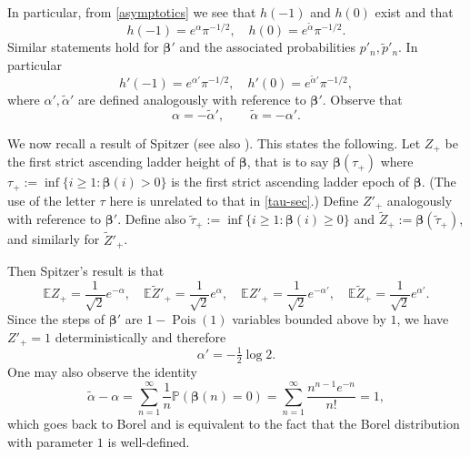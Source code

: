 \documentclass[11pt,reqno]{amsart}
\numberwithin{equation}{section}
\theoremstyle{definition}
\theoremstyle{remark}
\newcommand{\mb}{\mathbb}
\newcommand\Pois{\operatorname{Pois}}
\def\boldbeta{\boldsymbol\beta}
\renewcommand{\ge}{\geqslant}
\begin{document}
In particular, from \cref{asymptotics} we see that $h(-1)$ and $h(0)$ exist and that 
\begin{equation} \label{h0-form} h(-1) = e^{\alpha} \pi^{-1/2}, \quad h(0) = e^{\tilde\alpha} \pi^{-1/2}.\end{equation}
Similar statements hold for $\boldbeta'$ and the associated probabilities $p'_n, \tilde p'_n$. In particular
\begin{equation} \label{h0dash-form} h'(-1) = e^{\alpha'} \pi^{-1/2}, \quad h'(0) = e^{\tilde\alpha'} \pi^{-1/2},\end{equation} where $\alpha', \tilde\alpha'$ are defined analogously with reference to $\boldbeta'$. Observe that 
\begin{equation} \label{alpha-alpha-prime} \alpha = -\tilde\alpha', \qquad \tilde\alpha = -\alpha'.\end{equation}

We now recall a result of Spitzer \cite[Theorem 3.4]{spitzer-tauberian} (see also \cite[XVIII.5, Theorem 1]{feller2}). This states the following. Let $Z_+$ be the first strict ascending ladder height of $\boldbeta$, that is to say $\boldbeta(\tau_+)$ where $\tau_+ := \inf\{ i \ge 1 : \boldbeta(i) > 0\}$ is the first strict ascending ladder epoch of $\boldbeta$. (The use of the letter $\tau$ here is unrelated to that in \cref{tau-sec}.) Define $Z'_+$ analogously with reference to $\boldbeta'$. Define also $\tilde\tau_+ := \inf\{ i \ge 1: \boldbeta(i) \ge 0\}$ and $\tilde Z_+ := \boldbeta(\tilde\tau_+)$, and similarly for $\tilde Z'_+$.


Then Spitzer's result is that \begin{equation}\label{spitzer-beta} \mb{E} Z_+ = \frac{1}{\sqrt{2}} e^{-\alpha}, \quad \mb{E} \tilde Z'_+ = \frac{1}{\sqrt{2}} e^{\alpha},\quad \mb{E} Z'_+ = \frac{1}{\sqrt{2}} e^{-\alpha'}, \quad \mb{E} \tilde Z_+ = \frac{1}{\sqrt{2}} e^{\alpha'}.\end{equation} 
Since the steps of $\boldbeta'$ are $1 - \Pois(1)$ variables bounded above by $1$, we have $Z'_+ = 1$ deterministically and therefore 
\begin{equation}\label{alpha-dash} \alpha' = -\tfrac{1}{2}\log 2.\end{equation}
One may also observe the identity
\begin{equation}\label{borel-eval} \tilde\alpha - \alpha = \sum_{n = 1}^{\infty} \frac{1}{n} \mb{P}(\boldbeta(n) = 0) = \sum_{n = 1}^{\infty} \frac{n^{n - 1} e^{-n}}{n!} = 1,\end{equation} which goes back to Borel \cite{borel} and is equivalent to the fact that the Borel distribution with parameter $1$ is well-defined. 
\end{document}
